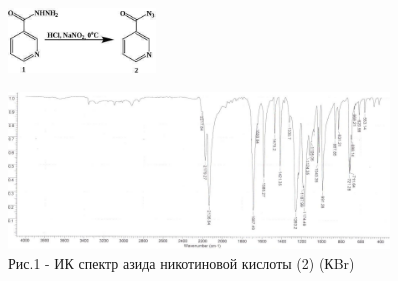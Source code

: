 \begin{figure}[H]
	\centering
	\includegraphics[width=0.35\textwidth]{assets/1}
\end{figure}

\begin{figure}[H]
	\centering
	\includegraphics[width=0.9\textwidth]{assets/2}
	\caption*{Рис.1 - ИК спектр азида никотиновой кислоты (2) (КBr)}
\end{figure}


